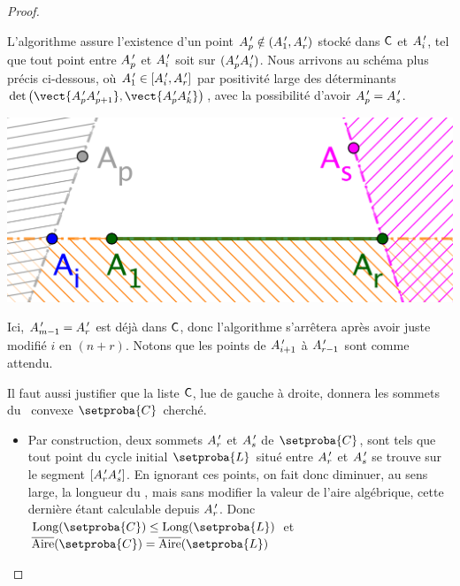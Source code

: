 \begin{proof}
\begin{itemize}
        \noindent
        L'algorithme assure l'existence d'un point $A^{\,\prime}_p \notin ( A^{\,\prime}_1 , A^{\,\prime}_r )$ stocké dans $\mathsf{C}$ et  $A^{\,\prime}_i$,
        tel que tout point entre $A^{\,\prime}_p$ et $A^{\,\prime}_i$ soit sur $(A^{\,\prime}_p A^{\,\prime}_i)$.
        Nous arrivons au schéma plus précis ci-dessous, où
        $A^{\,\prime}_1 \in [ A^{\,\prime}_i , A^{\,\prime}_r ]$
        par positivité large des déterminants
        $\det \big( \vect{\primeit{A}_p \primeit{A}_{p+1}}, \vect{\primeit{A}_p \primeit{A}_k} \big)$,
        avec la possibilité d'avoir $A^{\,\prime}_p = A^{\,\prime}_s$.
        \begin{center}
        	\includegraphics[scale=.4]{content/polygon/at-least-one/algo-kgone-terminate-3.png}
        \end{center}
        
        \noindent
        Ici,
        $A^{\,\prime}_{m-1} = A^{\,\prime}_r$ est déjà dans $\mathsf{C}$,
        donc l'algorithme s'arrêtera après avoir juste modifié $i$ en $(n + r)$.
        Notons que les points de $A^{\,\prime}_{i+1}$ à $A^{\,\prime}_{r-1}$ sont  comme attendu.
    \end{itemize}
    
    
    \medskip
    
    
    Il faut aussi justifier que la liste $\mathsf{C}$, lue de gauche à droite, donnera les sommets du \kgone\ convexe $\setproba{C}$ cherché.
    \begin{itemize}
        \item Par construction, deux sommets  $A^{\,\prime}_r$ et $A^{\,\prime}_s$ de $\setproba{C}$, sont tels que tout point du cycle initial $\setproba{L}$ situé entre $A^{\,\prime}_r$ et $A^{\,\prime}_s$ se trouve sur le segment $[A^{\,\prime}_r A^{\,\prime}_s]$.
        En ignorant ces points, on fait donc diminuer, au sens large, la longueur du \ncycle, mais sans modifier la valeur de l'aire algébrique, cette dernière étant calculable depuis $A^{\,\prime}_r$.
        Donc
        $\cyclelen{\setproba{C}} \leq \cyclelen{\setproba{L}}$
		et
		$\sarea{\setproba{C}} = \sarea{\setproba{L}}$



\end{itemize}
\end{proof}
